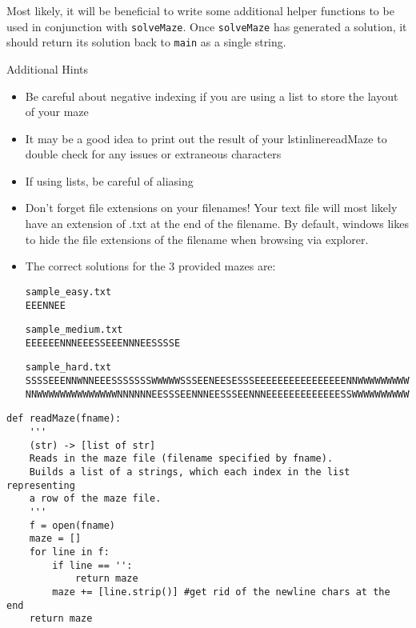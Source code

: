\documentclass[10pt,answers]{exam}
\begin{document}
\begin{questions}
\begin{parts}
Most likely, it will be beneficial to write some additional helper functions to be used in conjunction with \lstinline{solveMaze}.  Once \lstinline{solveMaze} has generated a solution, it should return its solution back to \lstinline{main} as a single string.
\end{parts}

Additional Hints
\begin{itemize}
    \item Be careful about negative indexing if you are using a list to store the layout of your maze

    \item It may be a good idea to print out the result of your lstinline{readMaze} to double check for any issues or extraneous characters

    \item If using lists, be careful of aliasing

    \item Don't forget file extensions on your filenames!  Your text file will most likely have an extension of .txt at the end of the filename.  By default, windows likes to hide the file extensions of the filename when browsing via explorer.

    \item The correct solutions for the 3 provided mazes are:

\begin{verbatim}
sample_easy.txt
EEENNEE
\end{verbatim}

\begin{verbatim}
sample_medium.txt
EEEEEENNNEEESSEEENNNEESSSSE
\end{verbatim}

\begin{verbatim}
sample_hard.txt
SSSSEEENNWNNEEESSSSSSSWWWWWSSSEENEESESSSEEEEEEEEEEEEEEEENNWWWWWWWWWWWWWWNNEEEEEEEEEEEEEE
NNWWWWWWWWWWWWWWNNNNNNEESSSEENNNEESSSEENNNEEEEEEEEEEEEESSWWWWWWWWWWWSSEEEEEEEEEEESSSSSSSS
\end{verbatim}
\end{itemize}


\begin{solution}
\begin{lstlisting}
def readMaze(fname):
    '''
    (str) -> [list of str]
    Reads in the maze file (filename specified by fname).
    Builds a list of a strings, which each index in the list representing
    a row of the maze file.
    '''
    f = open(fname)
    maze = []
    for line in f:
        if line == '':
            return maze
        maze += [line.strip()] #get rid of the newline chars at the end
    return maze




\end{lstlisting}
\end{solution}
\end{questions}
\end{document}
